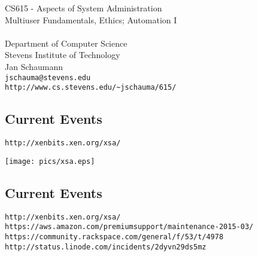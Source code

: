 \documentclass[xga]{xdvislides}
\begin{document}
\setfontphv

\lhead{\slidetitle}                               %
\cfoot{\relax}                               %
\rfoot{\Gray{\today}}

\vspace*{\fill}
\begin{center}
	\Hugesize
		CS615 - Aspects of System Administration\\ [1em]
		Multiuser Fundamentals, Ethics; Automation I\\ [1em]
	\hspace*{5mm}\blueline\\ [1em]
	\Normalsize
		Department of Computer Science\\
		Stevens Institute of Technology\\
		Jan Schaumann\\
		\verb+jschauma@stevens.edu+\\
		\verb+http://www.cs.stevens.edu/~jschauma/615/+
\end{center}
\vspace*{\fill}

\subsection{Current Events}
\verb+http://xenbits.xen.org/xsa/+
\vspace*{\fill}
\begin{center}
	\texttt{[image: pics/xsa.eps]}
\end{center}
\vspace*{\fill}

\subsection{Current Events}
\verb+http://xenbits.xen.org/xsa/+ \\

\verb+https://aws.amazon.com/premiumsupport/maintenance-2015-03/+ \\

\verb+https://community.rackspace.com/general/f/53/t/4978+ \\

\verb+http://status.linode.com/incidents/2dyvn29ds5mz+
\end{document}
